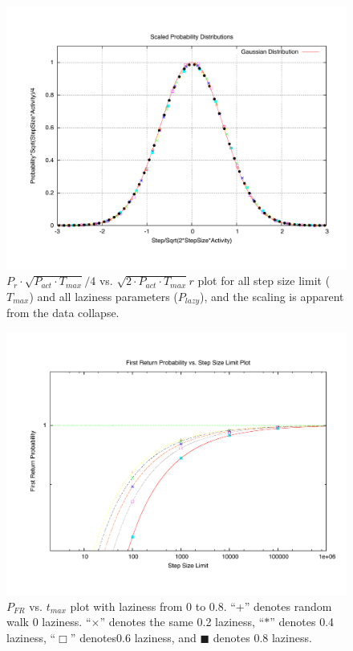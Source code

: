 \documentclass[12pt]{article}
\begin{document}
\newpage
\begin{figure}
\centering
\includegraphics[width=\textwidth]{dist_sc.pdf}
\caption{$P_r \cdot \sqrt{P_{act} \cdot T_{max}}/4$ vs. $\sqrt{2\cdot P_{act} \cdot T_{max}}r$ plot for all step size limit ($T_{max}$) and all laziness parameters ($P_{lazy}$), and the scaling is apparent from the data collapse.}
\label{fig:dist_sc}
\end{figure}

\newpage
\begin{figure}
\centering
\includegraphics[width=\textwidth]{unscaled_frp.pdf}
\caption{$P_{FR}$ vs. $t_{max}$ plot with laziness from 0 to 0.8. ``+'' denotes random walk 0 laziness. ``$\times$'' denotes the same 0.2 laziness, ``$\ast$'' denotes 0.4 laziness, ``$\Box$'' denotes0.6  laziness, and $\blacksquare$ denotes 0.8 laziness.}
\label{fig:frp_var}
\end{figure}
\end{document}
